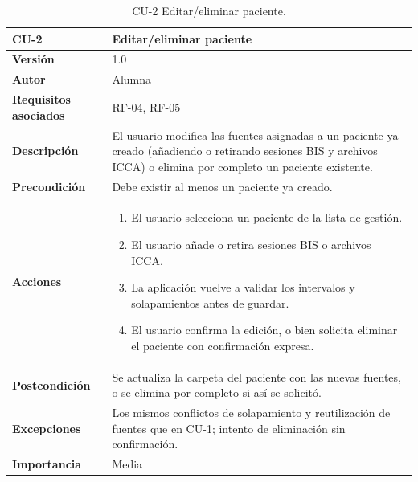 \documentclass[
  spanish,
  a4paper,
  12pt,
  twoside]{memoir}
\providecommand{\tightlist}{%
  \setlength{\itemsep}{0pt}\setlength{\parskip}{0pt}}
\begin{document}
\begin{table}[p]
    \centering
    \begin{tabularx}{\linewidth}{ p{} p{} }
        \toprule
        \textbf{CU-2}    & \textbf{Editar/eliminar paciente}\\
        \toprule
        \textbf{Versión}              & 1.0    \\
        \textbf{Autor}                & Alumna \\
        \textbf{Requisitos asociados} & RF-04, RF-05 \\
        \textbf{Descripción}          & El usuario modifica las fuentes asignadas a un paciente ya creado (añadiendo o retirando sesiones BIS y archivos ICCA) o elimina por completo un paciente existente. \\
        \textbf{Precondición}         & Debe existir al menos un paciente ya creado. \\
        \textbf{Acciones}             &
        \begin{enumerate}
            \def\labelenumi{\arabic{enumi}.}
            \tightlist
            \item El usuario selecciona un paciente de la lista de gestión.
            \item El usuario añade o retira sesiones BIS o archivos ICCA.
            \item La aplicación vuelve a validar los intervalos y solapamientos antes de guardar.
            \item El usuario confirma la edición, o bien solicita eliminar el paciente con confirmación expresa.
        \end{enumerate}\\
        \textbf{Postcondición}        & Se actualiza la carpeta del paciente con las nuevas fuentes, o se elimina por completo si así se solicitó. \\
        \textbf{Excepciones}          & Los mismos conflictos de solapamiento y reutilización de fuentes que en CU-1; intento de eliminación sin confirmación. \\
        \textbf{Importancia}          & Media \\
        \bottomrule
    \end{tabularx}
    \caption{CU-2 Editar/eliminar paciente.}
\end{table}
\end{document}
